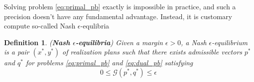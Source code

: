 \documentclass{article} %
\newtheorem{definition}[theorem]{Definition}
\begin{document}


Solving problem \eqref{eq:primal_pb} exactly is impossible in practice, and such a precision doesn't have any fundamental advantage. Instead, it is customary compute so-called Nash $\epsilon$-equlibria

\begin{definition}(\textbf{Nash $\epsilon$-equilibria})
Given a margin $\epsilon > 0$, a Nash $\epsilon$-equilibrium is a pair $(x^*, y^*)$ of realization plans such that there exists admissible vectors $p^*$ and $q^*$ for problems \eqref{eq:primal_pb} and \eqref{eq:dual_pb} satisfying
\begin{equation}
  0 \le \mathcal{G}(p^*, q^*) \le \epsilon
\label{eq:approx_pb}
\end{equation}
\end{definition}
\end{document}
